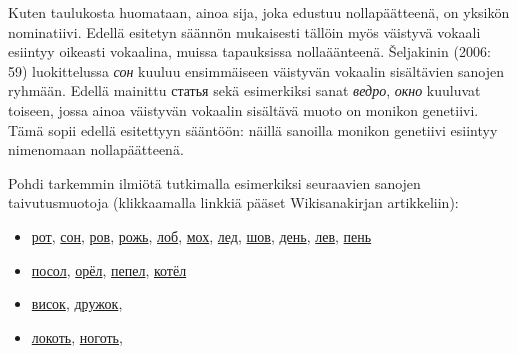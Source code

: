 \documentclass[]{scrreprt}
\providecommand{\tightlist}{%
  \setlength{\itemsep}{0pt}\setlength{\parskip}{0pt}}
\begin{document}
Kuten taulukosta huomataan, ainoa sija, joka edustuu nollapäätteenä, on
yksikön nominatiivi. Edellä esitetyn säännön mukaisesti tällöin myös
väistyvä vokaali esiintyy oikeasti vokaalina, muissa tapauksissa
nollaäänteenä. Šeljakinin (2006: 59) luokittelussa \emph{сон} kuuluu
ensimmäiseen väistyvän vokaalin sisältävien sanojen ryhmään. Edellä
mainittu статья sekä esimerkiksi sanat \emph{ведро}, \emph{окно}
kuuluvat toiseen, jossa ainoa väistyvän vokaalin sisältävä muoto on
monikon genetiivi. Tämä sopii edellä esitettyyn sääntöön: näillä
sanoilla monikon genetiivi esiintyy nimenomaan nollapäätteenä.

Pohdi tarkemmin ilmiötä tutkimalla esimerkiksi seuraavien sanojen
taivutusmuotoja (klikkaamalla linkkiä pääset Wikisanakirjan
artikkeliin):

\begin{itemize}
\tightlist
\item
  \href{https://ru.wiktionary.org/wiki/\%D1\%80\%D0\%BE\%D1\%82}{рот},
  \href{https://ru.wiktionary.org/wiki/\%D1\%81\%D0\%BE\%D0\%BD}{сон},
  \href{https://ru.wiktionary.org/wiki/\%D1\%80\%D0\%BE\%D0\%B2}{ров},
  \href{https://ru.wiktionary.org/wiki/\%D1\%80\%D0\%BE\%D0\%B6\%D1\%8C}{рожь},
  \href{https://ru.wiktionary.org/wiki/\%D0\%BB\%D0\%BE\%D0\%B1}{лоб},
  \href{https://ru.wiktionary.org/wiki/\%D0\%BC\%D0\%BE\%D1\%85}{мох},
  \href{https://ru.wiktionary.org/wiki/\%D0\%BB\%D0\%B5\%D0\%B4}{лед},
  \href{https://ru.wiktionary.org/wiki/\%D1\%88\%D0\%BE\%D0\%B2}{шов},
  \href{https://ru.wiktionary.org/wiki/\%D0\%B4\%D0\%B5\%D0\%BD\%D1\%8C}{день},
  \href{https://ru.wiktionary.org/wiki/\%D0\%BB\%D0\%B5\%D0\%B2}{лев},
  \href{https://ru.wiktionary.org/wiki/\%D0\%BF\%D0\%B5\%D0\%BD\%D1\%8C}{пень}
\item
  \href{https://ru.wiktionary.org/wiki/\%D0\%BF\%D0\%BE\%D1\%81\%D0\%BE\%D0\%BB}{посол},
  \href{https://ru.wiktionary.org/wiki/\%D0\%BE\%D1\%80\%D1\%91\%D0\%BB}{орёл},
  \href{https://ru.wiktionary.org/wiki/\%D0\%BF\%D0\%B5\%D0\%BF\%D0\%B5\%D0\%BB}{пепел},
  \href{https://ru.wiktionary.org/wiki/\%D0\%BA\%D0\%BE\%D1\%82\%D1\%91\%D0\%BB}{котёл}
\item
  \href{https://ru.wiktionary.org/wiki/\%D0\%B2\%D0\%B8\%D1\%81\%D0\%BE\%D0\%BA}{висок},
  \href{https://ru.wiktionary.org/wiki/\%D0\%B4\%D1\%80\%D1\%83\%D0\%B6\%D0\%BE\%D0\%BA}{дружок},
\item
  \href{https://ru.wiktionary.org/wiki/\%D0\%BB\%D0\%BE\%D0\%BA\%D0\%BE\%D1\%82\%D1\%8C}{локоть},
  \href{https://ru.wiktionary.org/wiki/\%D0\%BD\%D0\%BE\%D0\%B3\%D0\%BE\%D1\%82\%D1\%8C}{ноготь},

\end{itemize}
\end{document}
